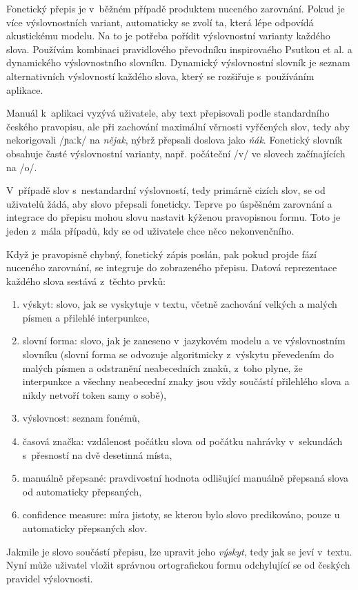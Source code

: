 Fonetický přepis je v~běžném případě produktem nuceného zarovnání. Pokud je více
výslovnostních variant, automaticky se zvolí ta, která lépe odpovídá akustickému
modelu. Na to je potřeba pořídit výslovnostní varianty každého slova. Používám
kombinaci pravidlového převodníku inspirovaého Psutkou et
al.\cite{psutka2004development} a dynamického výslovnostního slovníku. Dynamický
výslovnostní slovník je seznam alternativních výslovností každého slova, který
se rozšiřuje s~používáním aplikace.

Manuál k~aplikaci vyzývá uživatele, aby text přepisovali podle standardního
českého pravopisu, ale při zachování maximální věrnosti vyřčených slov, tedy aby
nekorigovali /ɲaːk/ na {\em nějak}, nýbrž
přepsali doslova jako {\em ňák}. Fonetický slovník obsahuje časté výslovnostní
varianty, např. počáteční /v/ ve slovech začínajících na /o/.

V~případě slov s~nestandardní výslovností, tedy primárně cizích slov, se od
uživatelů žádá, aby slovo přepsali foneticky. Teprve po úspěšném zarovnání a
integrace do přepisu mohou slovu nastavit kýženou pravopisnou formu. Toto je
jeden z~mála případů, kdy se od uživatele chce něco nekonvenčního.

Když je pravopisně chybný, fonetický zápis poslán, pak pokud projde fází
nuceného zarovnání, se integruje do zobrazeného přepisu. Datová reprezentace
každého slova sestává z~těchto prvků:
\begin{enumerate}
\item{výskyt:
    slovo, jak se vyskytuje v textu, včetně zachování velkých a malých písmen a
    přilehlé interpunkce,
}
\item{slovní forma:
    slovo, jak je zaneseno v~jazykovém modelu a ve výslovnostním slovníku
    (slovní forma se odvozuje algoritmicky z~výskytu převedením do malých písmen
    a odstranění neabecedních znaků, z~toho plyne, že interpunkce a všechny
    neabecední znaky jsou vždy součástí přilehlého slova a nikdy netvoří token
    samy o sobě),
}
\item{výslovnost:
    seznam fonémů,
}
\item{časová značka:
    vzdálenost počátku slova od počátku nahrávky v~sekundách s~přesností na dvě
    desetinná místa,
}
\item{manuálně přepsané:
    pravdivostní hodnota odlišující manuálně přepsaná slova od automaticky
    přepsaných,
}
\item{confidence measure:
    míra jistoty, se kterou bylo slovo predikováno, pouze u automaticky
    přepsaných slov.
}
\end{enumerate}
Jakmile je slovo součástí přepisu, lze upravit jeho {\em výskyt}, tedy jak se
jeví v~textu. Nyní může uživatel vložit správnou ortografickou formu odchylující
se od českých pravidel výslovnosti.

